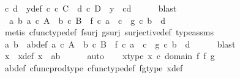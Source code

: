\begin{isabellebody}
\ c\ d\ \ y{\isacharunderscore}{\kern0pt}def{\isacharcolon}{\kern0pt}\ {\isachardoublequoteopen}c\ {\isasymin}\isactrlsub c\ C\ {\isasymand}\ d\ {\isasymin}\isactrlsub c\ D\ {\isasymand}\ y\ {\isacharequal}{\kern0pt}\ {\isasymlangle}c{\isacharcomma}{\kern0pt}d{\isasymrangle}{\isachardoublequoteclose}\isanewline
\ \ \ \ \isamarkupfalse%
\ blast\isanewline
\ \ \isamarkupfalse%
\ \isamarkupfalse%
\ {\isachardoublequoteopen}{\isasymexists}\ a\ b{\isachardot}{\kern0pt}\ a\ {\isasymin}\isactrlsub c\ A\ {\isasymand}\ b\ {\isasymin}\isactrlsub c\ B\ {\isasymand}\ f\ {\isasymcirc}\isactrlsub c\ a\ {\isacharequal}{\kern0pt}\ c\ {\isasymand}\ g\ {\isasymcirc}\isactrlsub c\ b\ {\isacharequal}{\kern0pt}\ d{\isachardoublequoteclose}\isanewline
\ \ \ \ \isamarkupfalse%
\ {\isacharparenleft}{\kern0pt}metis\ cfunc{\isacharunderscore}{\kern0pt}type{\isacharunderscore}{\kern0pt}def\ f{\isacharunderscore}{\kern0pt}surj\ g{\isacharunderscore}{\kern0pt}surj\ surjective{\isacharunderscore}{\kern0pt}def\ type{\isacharunderscore}{\kern0pt}assms{\isacharparenright}{\kern0pt}\isanewline
\ \ \isamarkupfalse%
\ \isamarkupfalse%
\ a\ b\ \ ab{\isacharunderscore}{\kern0pt}def{\isacharcolon}{\kern0pt}\ {\isachardoublequoteopen}a\ {\isasymin}\isactrlsub c\ A\ {\isasymand}\ b\ {\isasymin}\isactrlsub c\ B\ {\isasymand}\ f\ {\isasymcirc}\isactrlsub c\ a\ {\isacharequal}{\kern0pt}\ c\ {\isasymand}\ g\ {\isasymcirc}\isactrlsub c\ b\ {\isacharequal}{\kern0pt}\ d{\isachardoublequoteclose}\isanewline
\ \ \ \ \isamarkupfalse%
\ blast\isanewline
\ \ \isamarkupfalse%
\ \isamarkupfalse%
\ x\ \ x{\isacharunderscore}{\kern0pt}def{\isacharcolon}{\kern0pt}\ {\isachardoublequoteopen}x\ {\isacharequal}{\kern0pt}\ {\isasymlangle}a{\isacharcomma}{\kern0pt}b{\isasymrangle}{\isachardoublequoteclose}\isanewline
\ \ \ \ \isamarkupfalse%
\ auto\isanewline
\ \ \isamarkupfalse%
\ x{\isacharunderscore}{\kern0pt}type{\isacharcolon}{\kern0pt}\ {\isachardoublequoteopen}x\ {\isasymin}\isactrlsub c\ domain\ {\isacharparenleft}{\kern0pt}f\ {\isasymtimes}\isactrlsub f\ g{\isacharparenright}{\kern0pt}{\isachardoublequoteclose}\isanewline
\ \ \ \ \isamarkupfalse%
\ ab{\isacharunderscore}{\kern0pt}def\ cfunc{\isacharunderscore}{\kern0pt}prod{\isacharunderscore}{\kern0pt}type\ cfunc{\isacharunderscore}{\kern0pt}type{\isacharunderscore}{\kern0pt}def\ fg{\isacharunderscore}{\kern0pt}type\ x{\isacharunderscore}{\kern0pt}def\ \isamarkupfalse%

\end{isabellebody}
